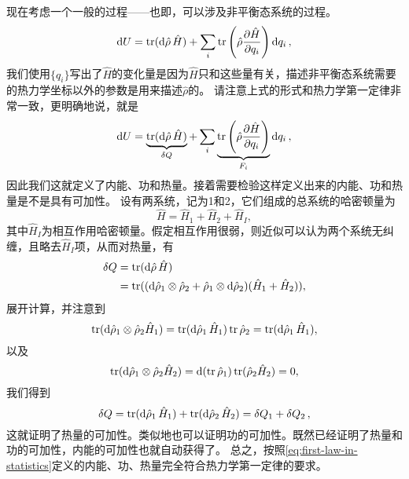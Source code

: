\documentclass[hyperref, UTF8, a4paper]{ctexart}
\begin{document}
现在考虑一个一般的过程——也即，可以涉及非平衡态系统的过程。
\[
    \dd{U} = \trace (\dd{\hat{\rho}} \hat{H}) + \sum_i \trace \left( \hat{\rho} \pdv{\hat{H}}{q_i} \right) \dd{q_i},
\]
我们使用$\{q_i\}$写出了$\hat{H}$的变化量是因为$\hat{H}$只和这些量有关，描述非平衡态系统需要的热力学坐标以外的参数是用来描述$\hat{\rho}$的。
请注意上式的形式和热力学第一定律非常一致，更明确地说，就是
\begin{equation}
    \dd{U} = \underbrace{\trace (\dd{\hat{\rho}} \hat{H})}_{\var{Q}} + \sum_i \underbrace{\trace \left( \hat{\rho} \pdv{\hat{H}}{q_i} \right)}_{F_i} \dd{q_i},
    \label{eq:first-law-in-statistics}
\end{equation}
因此我们这就定义了内能、功和热量。接着需要检验这样定义出来的内能、功和热量是不是具有可加性。
设有两系统，记为1和2，它们组成的总系统的哈密顿量为
\[
    \hat{H} = \hat{H}_1 + \hat{H}_2 + \hat{H}_I,
\]
其中$\hat{H}_I$为相互作用哈密顿量。假定相互作用很弱，则近似可以认为两个系统无纠缠，且略去$\hat{H}_I$项，从而对热量，有
\[
    \begin{aligned}
        \var{Q} &= \trace (\dd{\hat{\rho}} \hat{H}) \\
        &= \trace ((\dd{\hat{\rho}_1} \otimes \hat{\rho}_2 + \hat{\rho}_1 \otimes \dd{\hat{\rho}_2}) (\hat{H}_1 + \hat{H}_2)),
    \end{aligned}
\]
展开计算，并注意到
\[
    \trace (\dd{\hat{\rho}_1} \otimes \hat{\rho}_2 \hat{H}_1) = \trace(\dd{\hat{\rho}_1} \hat{H}_1) \trace \hat{\rho}_2 = \trace(\dd{\hat{\rho}_1} \hat{H}_1),
\]
以及
\[
    \trace (\dd{\hat{\rho}_1} \otimes \hat{\rho}_2 \hat{H}_2) = \dd{(\trace \hat{\rho}_1)} \trace(\hat{\rho}_2 \hat{H}_2) = 0,
\]
我们得到
\[
    \var{Q} = \trace(\dd{\hat{\rho}_1} \hat{H}_1) + \trace(\dd{\hat{\rho}_2} \hat{H}_2) = \var{Q_1} + \var{Q_2},
\]
这就证明了热量的可加性。类似地也可以证明功的可加性。既然已经证明了热量和功的可加性，内能的可加性也就自动获得了。
总之，按照\eqref{eq:first-law-in-statistics}定义的内能、功、热量完全符合热力学第一定律的要求。
\end{document}
